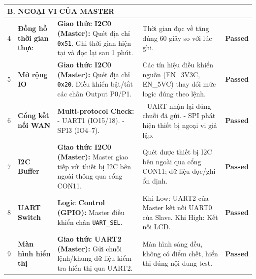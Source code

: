 \begin{longtable}{|c|p{}|p{}|p{}|c|}
                    \multicolumn{5}{|l|}{\textbf{B. NGOẠI VI CỦA MASTER}} \\ \hline
        
                    4 & \textbf{Đồng hồ thời gian thực} & \textbf{Giao thức I2C0 (Master):} \newline Quét địa chỉ \texttt{0x51}. Ghi thời gian hiện tại và đọc lại sau 1 phút. & Thời gian đọc về tăng đúng 60 giây so với lúc ghi. & \textcolor{modern_blue}{\textbf{Passed}} \\ \hline
        
                    5 & \textbf{Mở rộng IO} & \textbf{Giao thức I2C0 (Master):} \newline Quét địa chỉ \texttt{0x20}. Điều khiển bật/tắt các chân Output P0/P1. & Các tín hiệu điều khiển nguồn (EN\_3V3C, EN\_5VC) thay đổi mức logic đúng theo lệnh. & \textcolor{modern_blue}{\textbf{Passed}} \\ \hline
        
                    6 & \textbf{Cổng kết nối WAN} & \textbf{Multi-protocol Check:} \newline - UART1 (IO15/18). \newline - SPI3 (IO4--7). & - UART nhận lại đúng chuỗi đã gửi. \newline - SPI phát hiện thiết bị ngoại vi giả lập. & \textcolor{modern_blue}{\textbf{Passed}} \\ \hline
        
                    7 & \textbf{I2C Buffer} & \textbf{Giao thức I2C0 (Master):} \newline Master giao tiếp với thiết bị I2C bên ngoài thông qua cổng CON11. & Quét được thiết bị I2C bên ngoài qua cổng CON11; dữ liệu đọc/ghi ổn định. & \textcolor{modern_blue}{\textbf{Passed}} \\ \hline
        
                    8 & \textbf{UART Switch} & \textbf{Logic Control (GPIO):} \newline Master điều khiển chân \texttt{UART\_SEL}. & Khi Low: UART2 của Master kết nối UART0 của Slave. Khi High: Kết nối LCD. & \textcolor{modern_blue}{\textbf{Passed}} \\ \hline
        
                    9 & \textbf{Màn hình hiển thị} & \textbf{Giao thức UART2 (Master):} \newline Gửi chuỗi lệnh/khung dữ liệu kiểm tra hiển thị qua UART2. & Màn hình sáng đều, không có điểm chết, hiển thị đúng nội dung test. & \textcolor{modern_blue}{\textbf{Passed}} \\ \hline
        

\end{longtable}
